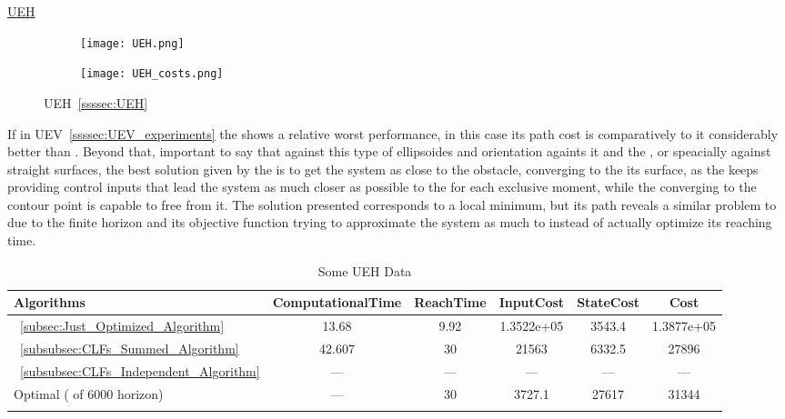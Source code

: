   \newpage %


\underline{UEH}
\label{ssssec:UEH_experiments} %

 \begin{figure}[htbp]
  \begin{subfigure}{0.6\textwidth}
    \centering
    \texttt{[image: UEH.png]}
  \label{fig:UEH_CostEvol}
  \end{subfigure}
  \begin{subfigure}{0.59\textwidth}
    \centering
    \texttt{[image: UEH\_costs.png]}
  \label{fig:UEH_trajectory}
  \end{subfigure}
  \caption{UEH~\ref{ssssec:UEH}}
\label{fig:UEHTrajectory_and_CostEvol}
\end{figure}


If in UEV~\ref{ssssec:UEV_experiments} the  shows a relative worst performance, in this case its path cost is comparatively to it considerably better than . Beyond that, important to say that against this type of ellipsoides and orientation againts it and the \txtref, or speacially against straight surfaces, the best solution given by the  is to get the system as close to the obstacle, converging to the its surface, as the  keeps providing control inputs that lead the system as much closer as possible to the \txtref for each exclusive moment, while the  converging to the contour point is capable to free from it. The  solution presented corresponds to a local minimum, but its path reveals a similar problem to  due to the finite horizon and its objective function trying to approximate the system as much to \txtref instead of actually optimize its reaching time.


\bgroup
 \begin{xltabular}{\textwidth}{|l|ccccc|}
   \toprule
   Algorithms   & ComputationalTime  & ReachTime  & InputCost   & StateCost & Cost           \\
   \midrule
    ~\ref{subsec:Just_Optimized_Algorithm}           & 13.68  & 9.92  & 1.3522e+05 & 3543.4 & 1.3877e+05 \\
    ~\ref{subsubsec:CLFs_Summed_Algorithm}        & 42.607  & 30     & 21563 & 6332.5 & 27896 \\
    ~\ref{subsubsec:CLFs_Independent_Algorithm}   & ---   & ---      & ---  & ---  & ---  \\
    Optimal ( of 6000 horizon)                        & ---    & 30 & 3727.1  & 27617 & 31344 \\
    \midrule
    \caption{Some UEH Data}
   \label{tab:Some_UEH_Data}\\
   \end{xltabular}
 \egroup


